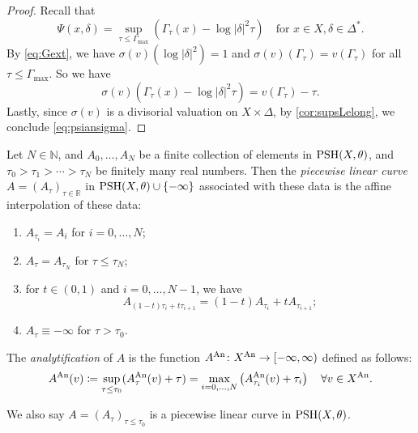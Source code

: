 \begin{proof}
Recall that
\[
\Psi(x,\delta)=\sup_{\tau\leq \Gamma_{\max}} (\Gamma_{\tau}(x)-\log|\delta|^2\tau)\quad \text{for }x\in X, \delta\in \Delta^*.
\]
By \eqref{eq:Gext}, we have $\sigma(v)(\log |\delta|^2)=1$ and $\sigma(v)(\Gamma_{\tau})=v(\Gamma_{\tau})$ for all $\tau\leq \Gamma_{\max}$. So we have
\[
\sigma(v)(\Gamma_\tau(x) - \log|\delta|^2 \tau) = v(\Gamma_\tau) - \tau.
\]
Lastly, since $\sigma(v)$ is a divisorial valuation on $X \times \Delta$, by \cref{cor:supsLelong}, we conclude \eqref{eq:psiansigma}.
\end{proof}

\begin{definition}\label{def:piecewiselincurv}
Let $N\in \mathbb{N}$, and $A_{0},\ldots,A_N$ be a finite collection of elements in $\mathrm{PSH}(X,\theta)$, and $\tau_0>\tau_1>\cdots>\tau_N$ be finitely many real numbers. Then the \emph{piecewise linear curve} $A=(A_{\tau})_{\tau\in \mathbb{R}}$ in $\mathrm{PSH}(X,\theta)\cup \{-\infty\}$ associated with these data is the affine interpolation of these data:
\begin{enumerate}
    \item\label{itm:def:piecewiselincurv:1} $A_{\tau_i}=A_i$ for $i=0,\ldots,N$;
    \item\label{itm:def:piecewiselincurv:2} $A_{\tau}=A_{\tau_N}$ for $\tau\leq \tau_N$;
    \item\label{itm:def:piecewiselincurv:3} for $t\in (0,1)$ and $i=0,\ldots,N-1$, we have
    \[
        A_{(1-t)\tau_i+t\tau_{i+1}}=(1-t)A_{\tau_i}+tA_{\tau_{i+1}};
    \]
    \item\label{itm:def:piecewiselincurv:4} $A_{\tau}\equiv -\infty$ for $\tau>\tau_0$.
\end{enumerate}
The \emph{analytification} of $A$ is the function $A^{\mathrm{An}}\colon X^{\mathrm{An}}\rightarrow [-\infty,\infty)$ defined as follows:
\begin{equation}\label{eq:psianvlinear}
A^{\mathrm{An}}(v)\coloneqq \sup_{\tau\leq \tau_0} (A_\tau^{\mathrm{An}}(v)+\tau)=\max_{i=0,\ldots,N} \left(A_{\tau_i}^{\mathrm{An}}(v)+\tau_i\right)\quad \forall v\in X^{\mathrm{An}}.
\end{equation}
\end{definition}
We also say $A=(A_{\tau})_{\tau\leq \tau_0}$ is a piecewise linear curve in $\mathrm{PSH}(X,\theta)$.

